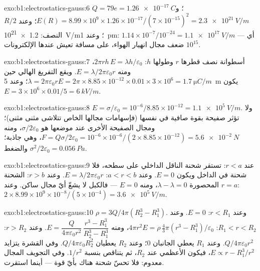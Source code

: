 \begin{solution}{exo:b1:electrostatics-gauss:6}
$Q = 79e = \qty{1.26e-17}{C}$؛ و $E(R) = 8.99 \times 10^9 \times 1.26 \times 10^{-17}/
(7 \times 10^{-15})^2 = \qty{2.3e21}{V/m}$؛ وعند $R/2$ النصف: \qty{1.2e21}{V/m}؛ وعند
\qty{1}{pm}: $1.14 \times 10^{-7}/10^{-24} = \qty{1.1e17}{V/m}$ --- أي $10^{15}$ ضعف
مجال انهيار الهواء، على مسافة تعيش عندها الإلكترونات.
\end{solution}

\begin{solution}{exo:b1:electrostatics-gauss:7}
أسطوانة نصف قطرها $r$ وطولها $h$: $2\pi rh\,E = \lambda h/\varepsilon_0$، ومنه $E =
\lambda/2\pi\varepsilon_0r$. ويقع التفريغ الهالي حين $\lambda = 2\pi\varepsilon_0 rE = 2\pi \times 8.85 \times
10^{-12} \times 0.01 \times 3 \times 10^6 = \qty{1.7}{\micro C/m}$؛ وعند \qty{5}{m} يكون
$E = 3 \times 10^6 \times 0.01/5 = \qty{6}{kV/m}$.
\end{solution}

\begin{solution}{exo:b1:electrostatics-gauss:8}
$E = \sigma/\varepsilon_0 = 10^{-6}/8.85 \times 10^{-12} = \qty{1.1e5}{V/m}$. ولا تؤثر صفيحة
بقوة صافية في نفسها (فإسهامات مجالها الخاص تتلاشى
مثنى مثنى)؛ ومجال الصفيحة الأخرى عند موضعها هو $\sigma/2\varepsilon_0$، ومنه
$F = Q\sigma/2\varepsilon_0 = 10^{-6} \times 10^{-6}/(2 \times 8.85 \times 10^{-12}) =
\qty{5.6e-2}{N}$، وهي جاذبة؛ والضغط $\sigma^2/2\varepsilon_0 = \qty{0.056}{Pa}$.
\end{solution}

\begin{solution}{exo:b1:electrostatics-gauss:9}
عند $r < a$: تستقر شحنة الناقل الداخلي على سطحه، فلا شحنة
في الداخل ويكون $E = 0$. وعند $a < r < b$: $E = \lambda/2\pi\varepsilon_0r$. وعند $r > b$: الشحنة
المحصورة $\lambda - \lambda = 0$، ومنه $E = 0$ --- فالكبل لا يشعّ أيّ مجال
ساكن. وعند $r = a$: $2 \times 8.99 \times 10^9 \times 10^{-8}/(5 \times 10^{-4}) =
\qty{3.6e5}{V/m}$.
\end{solution}

\begin{solution}{exo:b1:electrostatics-gauss:10}
$\rho = 3Q/4\pi(R_2^3 - R_1^3)$. وعند $r < R_1$: $E = 0$. وعند $R_1 < r < R_2$: $4\pi r^2E =
\rho\,\tfrac43\pi(r^3 - R_1^3)/\varepsilon_0$، ومنه $E = \dfrac{Q}{4\pi\varepsilon_0r^2}\,
\dfrac{r^3 - R_1^3}{R_2^3 - R_1^3}$. وعند $r > R_2$: $Q/4\pi\varepsilon_0r^2$. وعند $R_1$ يعطي
الجانبان $0$؛ وعند $R_2$ يعطيان $Q/4\pi\varepsilon_0R_2^2$. وفي القشرة يتزايد $E
\propto r - R_1^3/r^2$، فيكون الأعظمي عند $R_2$، ثم
يتناقص بنسبة $1/r^2$. وفي التجويف المجال معدوم: فلا تحسّ شحنة
هناك بأيّ قوة --- أينما استقرت.
\end{solution}

